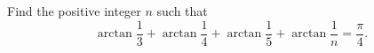 Find the positive integer $ n$ such that \[\arctan\frac{1}{3}+\arctan\frac{1}{4}+\arctan\frac{1}{5}+\arctan\frac{1}{n}=\frac{\pi}{4}.\]